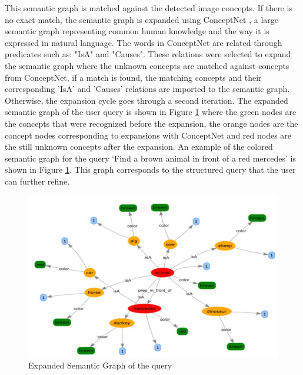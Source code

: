 \begin{itemize}
	  This semantic graph is matched against the detected image concepts. If there is no exact match, the semantic graph is expanded using ConceptNet \cite{a:concept}, a large semantic graph representing common human knowledge and the way it is expressed in natural language. The words in ConceptNet are related through predicates such as: "IsA" and "Causes". These relations were selected to expand the semantic graph where the unknown concepts are matched against concepts from  ConceptNet, if a match is found, the matching concepts and their corresponding 'IsA' and 'Causes' relations are imported to the semantic graph. Otherwise, the expansion cycle goes through a second iteration. The expanded semantic graph of the user query is shown in Figure \ref{exp} where the green nodes are the concepts that were recognized before the expansion, the orange nodes are the concept nodes corresponding to expansions with ConceptNet and red nodes are the still unknown concepts after the expansion. An example of the colored semantic graph  for the query ‘Find a brown animal in front of a red mercedes’ is shown in Figure \ref{exp}. This graph corresponds to the structured query that the user can further refine.
	\begin{figure}[!hb]
	  	\centering
	  	\includegraphics[scale=0.6]{graphics/expansion.png} 
	  	\caption{Expanded Semantic Graph of the query}
	  	\label{exp}
	\end{figure}
	  	

\end{itemize}
